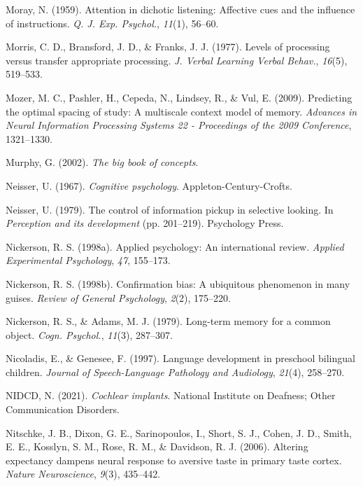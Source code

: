 \documentclass[
]{krantz}
\newlength{\cslhangindent}
\newenvironment{CSLReferences}[2] %
 {\begin{list}{}{%
  \setlength{\itemindent}{0pt}
  \setlength{\leftmargin}{0pt}
  \setlength{\parsep}{0pt}
  \ifodd #1
   \setlength{\leftmargin}{\cslhangindent}
   \setlength{\itemindent}{-1\cslhangindent}
  \fi
  \setlength{\itemsep}{#2\baselineskip}}}
 {\end{list}}
\begin{document}
\begin{CSLReferences}{1}{0}
Moray, N. (1959). Attention in dichotic listening: Affective cues and the influence of instructions. \emph{Q. J. Exp. Psychol.}, \emph{11}(1), 56--60.

Morris, C. D., Bransford, J. D., \& Franks, J. J. (1977). Levels of processing versus transfer appropriate processing. \emph{J. Verbal Learning Verbal Behav.}, \emph{16}(5), 519--533.

Mozer, M. C., Pashler, H., Cepeda, N., Lindsey, R., \& Vul, E. (2009). Predicting the optimal spacing of study: A multiscale context model of memory. \emph{Advances in Neural Information Processing Systems 22 - Proceedings of the 2009 Conference}, 1321--1330.

Murphy, G. (2002). \emph{The big book of concepts}.

Neisser, U. (1967). \emph{Cognitive psychology}. Appleton-Century-Crofts.

Neisser, U. (1979). The control of information pickup in selective looking. In \emph{Perception and its development} (pp. 201--219). Psychology Press.

Nickerson, R. S. (1998a). Applied psychology: An international review. \emph{Applied Experimental Psychology}, \emph{47}, 155--173.

Nickerson, R. S. (1998b). Confirmation bias: A ubiquitous phenomenon in many guises. \emph{Review of General Psychology}, \emph{2}(2), 175--220.

Nickerson, R. S., \& Adams, M. J. (1979). Long-term memory for a common object. \emph{Cogn. Psychol.}, \emph{11}(3), 287--307.

Nicoladis, E., \& Genesee, F. (1997). Language development in preschool bilingual children. \emph{Journal of Speech-Language Pathology and Audiology}, \emph{21}(4), 258--270.

NIDCD, N. (2021). \emph{Cochlear implants}. National Institute on Deafness; Other Communication Disorders.

Nitschke, J. B., Dixon, G. E., Sarinopoulos, I., Short, S. J., Cohen, J. D., Smith, E. E., Kosslyn, S. M., Rose, R. M., \& Davidson, R. J. (2006). Altering expectancy dampens neural response to aversive taste in primary taste cortex. \emph{Nature Neuroscience}, \emph{9}(3), 435--442.


\end{CSLReferences}
\end{document}
